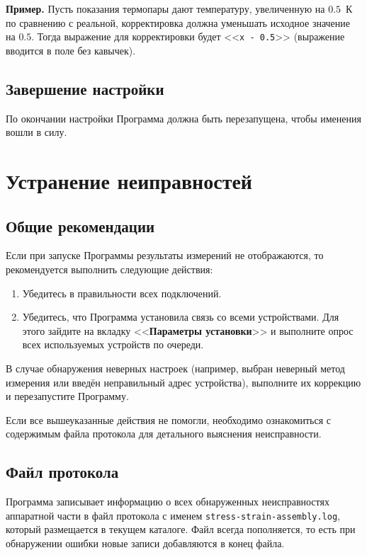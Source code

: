 \documentclass[12pt, a4paper, twocolumn]{book}
\newcommand{\PROGNAME}{stress-strain-assembly}
\newcommand{\CTL}[1]{<<{\bf #1}>>}
\newcommand{\CMD}[1]{<<{\tt #1}>>}
\newcommand{\FILENAME}[1]{{\tt #1}}
\begin{document}
{\bf Пример. } Пусть показания термопары дают температуру, увеличенную на $0.5$~К по сравнению с реальной, корректировка должна уменьшать исходное значение на $0.5$. Тогда выражение для корректировки будет \mbox{\CMD{x - 0.5}} (выражение вводится в поле без кавычек).

\section{Завершение настройки}

По окончании настройки Программа должна быть перезапущена, чтобы именения вошли в силу.

\chapter{Устранение неиправностей}

\section{Общие рекомендации}

Если при запуске Программы результаты измерений не отображаются, то рекомендуется выполнить следующие действия:

\begin{enumerate}
\item Убедитесь в правильности всех подключений.
\item Убедитесь, что Программа установила связь со всеми устройствами. Для этого зайдите на вкладку \CTL{Параметры установки} и выполните опрос всех используемых устройств по очереди.
\end{enumerate}

В случае обнаружения неверных настроек (например, выбран неверный метод измерения или введён неправильный адрес устройства), выполните их коррекцию и перезапустите Программу.

Если все вышеуказанные действия не помогли, необходимо ознакомиться с содержимым файла протокола для детального выяснения неисправности.

\section{Файл протокола}

Программа записывает информацию о всех обнаруженных неисправностях аппаратной части в файл протокола с именем \FILENAME{\PROGNAME{}.log}, который размещается в текущем каталоге. Файл всегда пополняется, то есть при обнаружении ошибки новые записи добавляются в конец файла.
\end{document}
